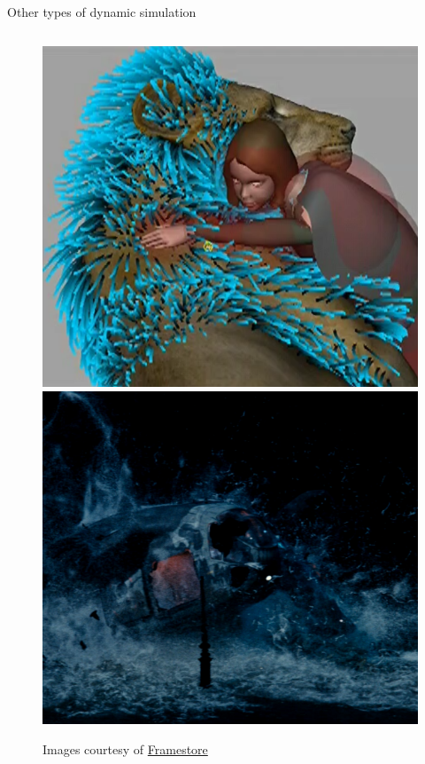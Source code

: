 \begin{frame}{Other types of dynamic simulation}
	\begin{columns}
		\begin{column}{0.3\textwidth}
			\begin{figure}
				\includegraphics[width=\textwidth]{hair}
				\includegraphics[width=\textwidth]{fluid}
				\caption*{Images courtesy of \href{https://www.framestore.com}{Framestore}}

\end{figure}
\end{column}
\end{columns}
\end{frame}
